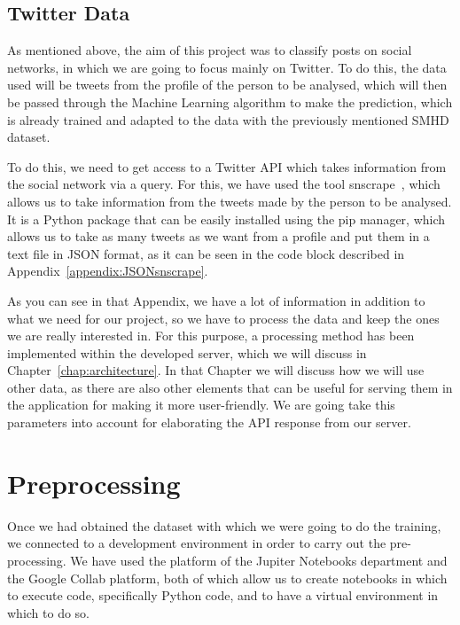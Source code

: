 \subsection{Twitter Data}
As mentioned above, the aim of this project was to classify posts on social networks, in which we are going to focus mainly on Twitter. To do this, the data used will be tweets from the profile of the person to be analysed, which will then be passed through the Machine Learning algorithm to make the prediction, which is already trained and adapted to the data with the previously mentioned SMHD dataset.

To do this, we need to get access to a Twitter API which takes information from the social network via a query. For this, we have used the tool snscrape~\cite{JustAnot83:online}, which allows us to take information from the tweets made by the person to be analysed. It is a Python package that can be easily installed using the pip manager, which allows us to take as many tweets as we want from a profile and put them in a text file in JSON format, as it can be seen in the code block described in Appendix~\ref{appendix:JSONsnscrape}.


As you can see in that Appendix, we have a lot of information in addition to what we need for our project, so we have to process the data and keep the ones we are really interested in. For this purpose, a processing method has been implemented within the developed server, which we will discuss in Chapter~\ref{chap:architecture}. In that Chapter we will discuss how we will use other data, as there are also other elements that can be useful for serving them in the application for making it more user-friendly. We are going take this parameters into account for elaborating the API response from our server.

\section{Preprocessing}
Once we had obtained the dataset with which we were going to do the training, we connected to a development environment in order to carry out the pre-processing. We have used the platform of the Jupiter Notebooks department and the Google Collab platform, both of which allow us to create notebooks in which to execute code, specifically Python code, and to have a virtual environment in which to do so.

